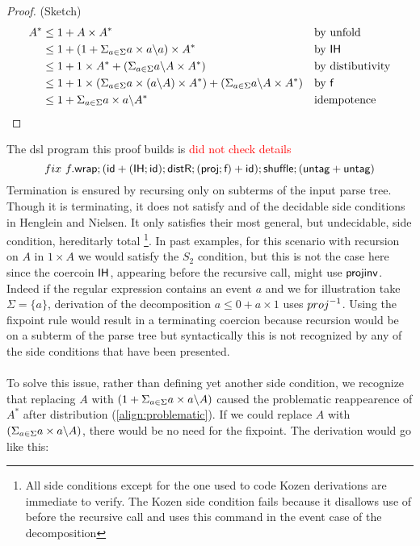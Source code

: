 \documentclass[a4paper,UKenglish,cleveref, autoref, thm-restate]{lipics-v2021}
\newcommand\mycomment[1]{\textcolor{red}{#1}}
\begin{document}
\begin{proof} (Sketch)
\begin{align}
A^* &\leq  1 + A \times A^* && \text{by unfold}\\
 &\leq 1 + (1 + \Sigma_{a \in \Sigma} a\times a \backslash a) \times A^* && \text{by } \textsf{IH}\\
 &\leq 1 + 1 \times A^* + (\Sigma_{a \in \Sigma} a \backslash A \times A^*) && \text{by distibutivity}\\
 &\leq 1 +  1 \times (\Sigma_{a \in \Sigma} a\times (a \backslash A)\times A^*) +  (\Sigma_{a \in \Sigma} a \backslash A \times A^*)  && \text{by } \textsf{f}  \\
 &\leq 1 + \Sigma_{a \in \Sigma} a\times a \backslash A^* && \text{idempotence} 
\end{align}
\end{proof}
The dsl program this proof builds is \mycomment{did not check details}
\[ \fix ~f.\dslcom{wrap};(\dslcom{id} + (\dslcom{IH};\dslcom {id});\dslcom{distR};(\dslcom{proj};\dslcom{f})+\dslcom{id});\dslcom{shuffle};(\dslcom{untag} + \dslcom{untag}) \]
Termination is ensured by recursing only on subterms of the input parse tree. Though it is terminating, it does not satisfy and of the decidable side conditions in Henglein and Nielsen. It only satisfies their most general, but undecidable, side condition, hereditarly total \footnote{All side conditions except for the one used to code Kozen derivations are immediate to verify. The Kozen side condition fails because it disallows use of  before the recursive call and  uses this command in the event case of the decomposition}.
In past examples, for this scenario with recursion on $A$ in $1 \times A$ we would satisfy the $S_2$ condition, but this is not the case here since the coercoin $\textsf{IH}$, appearing before the recursive call, might use $\textsf{projinv}$. Indeed if the regular expression contains an event $a$ and we for illustration take $\Sigma = \{a\}$, derivation of the decomposition $a \leq 0 + a \times 1 $ uses $\dslcominv{proj}$. Using the fixpoint rule would result in a terminating coercion because recursion would be on a subterm of the parse tree but syntactically this is not recognized by any of the side conditions that have been presented.\\\\
To solve this issue, rather than defining yet another side condition, we recognize that replacing $A$ with $(1 + \Sigma_{a \in \Sigma} a\times a \backslash A)$ caused the problematic reappearence of $A^*$ after distribution (\ref{align:problematic}). If we could replace $A$ with $(\Sigma_{a \in \Sigma} a\times a \backslash A)$, there would be no need for the fixpoint. The derivation would go like this:
\end{document}
